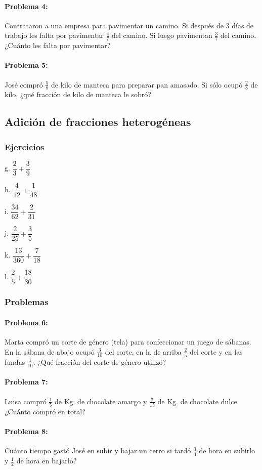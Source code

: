 \documentclass[10pt,twoside]{article}
\begin{document}
\paragraph*{Problema 4:} Contrataron a una empresa para pavimentar un camino. Si después de 3 días de trabajo les falta por pavimentar $\frac{4}{7}$ del camino. Si luego pavimentan $\frac{3}{7}$ del camino. ¿Cuánto les falta por pavimentar?
\paragraph*{Problema 5:} José compró $\frac{5}{8}$ de kilo de manteca para preparar pan amasado. Si sólo ocupó $\frac{2}{8}$ de kilo, ¿qué fracción de kilo de manteca le sobró?
\subsection*{Adici\'{o}n de fracciones heterog\'{e}neas}
\subsubsection*{Ejercicios}
\begin{enumerate}
\begin{multicols}{3}
\item[g.] $\dfrac{2}{3}+\dfrac{3}{9}$
\item[h.] $\dfrac{4}{12}+\dfrac{1}{48}$
\item[i.] $\dfrac{34}{62}+\dfrac{2}{31}$
\item[j.] $\dfrac{2}{25}+\dfrac{3}{5}$
\item[k.] $\dfrac{13}{360}+\dfrac{7}{18}$
\item[l.] $\dfrac{2}{5}+\dfrac{18}{30}$
\end{multicols}
\end{enumerate}
\subsubsection*{Problemas}
\paragraph*{Problema 6:} Marta compró un corte de género (tela) para confeccionar un juego de sábanas. En la sábana de abajo ocupó $\frac{3}{10}$ del corte, en la de arriba $\frac{2}{5}$ del corte y en las fundas $\frac{1}{10}$. ¿Qué fracción del corte de género utilizó?
\paragraph*{Problema 7:} Luisa compró $\frac{1}{5}$ de Kg. de chocolate amargo y $\frac{7}{15}$ de Kg. de chocolate dulce ¿Cuánto compró en total?
\paragraph*{Problema 8:} Cuánto tiempo gastó José en subir y bajar un cerro si tardó $\frac{3}{4}$ de hora en subirlo y $\frac{1}{2}$ de hora en bajarlo?
\end{document}
